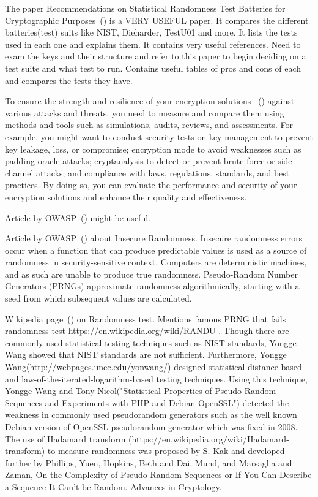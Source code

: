 The paper Recommendations on Statistical Randomness Test Batteries for Cryptographic Purposes~(\cite{10.1145/3447773}) is a VERY USEFUL paper. It compares the different batteries(test) suits like NIST, Dieharder, TestU01 and more. It lists the tests used in each one and explains them. It contains very useful references. Need to exam the keys and their structure and refer to this paper to begin deciding on a test suite and what test to run. Contains useful tables of pros and cons of each and compares the tests they have.

To ensure the strength and resilience of your encryption solutions ~(\cite{linkedInArticle}) against various attacks and threats, you need to measure and compare them using methods and tools such as simulations, audits, reviews, and assessments. For example, you might want to conduct security tests on key management to prevent key leakage, loss, or compromise; encryption mode to avoid weaknesses such as padding oracle attacks; cryptanalysis to detect or prevent brute force or side-channel attacks; and compliance with laws, regulations, standards, and best practices. By doing so, you can evaluate the performance and security of your encryption solutions and enhance their quality and effectiveness.

Article by OWASP~(\cite{OWASP}) might be useful.

Article by OWASP~(\cite{OWASP2}) about Insecure Randomness. Insecure randomness errors occur when a function that can produce predictable values is used as a source of randomness in security-sensitive context. Computers are deterministic machines, and as such are unable to produce true randomness. Pseudo-Random Number Generators (PRNGs) approximate randomness algorithmically, starting with a seed from which subsequent values are calculated.

Wikipedia page~(\cite{WIKI}) on Randomness test. Mentions famous PRNG that fails randomness test https://en.wikipedia.org/wiki/RANDU . Though there are commonly used statistical testing techniques such as NIST standards, Yongge Wang showed that NIST standards are not sufficient. Furthermore, Yongge Wang(http://webpages.uncc.edu/yonwang/) designed statistical-distance-based and law-of-the-iterated-logarithm-based testing techniques. Using this technique, Yongge Wang and Tony Nicol("Statistical Properties of Pseudo Random Sequences and Experiments with PHP and Debian OpenSSL") detected the weakness in commonly used pseudorandom generators such as the well known Debian version of OpenSSL pseudorandom generator which was fixed in 2008.  The use of Hadamard transform (https://en.wikipedia.org/wiki/Hadamard-transform) to measure randomness was proposed by S. Kak and developed further by Phillips, Yuen, Hopkins, Beth and Dai, Mund, and Marsaglia and Zaman, On the Complexity of Pseudo-Random Sequences or If You Can Describe a Sequence It Can't be Random. Advances in Cryptology. 


